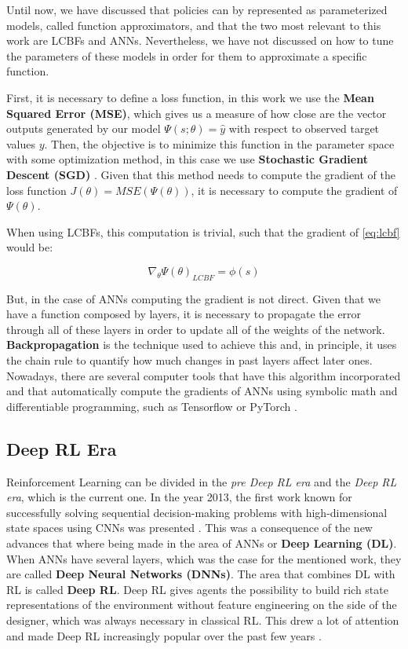 Until now, we have discussed that policies can by represented as parameterized models, called function approximators, and that the two most relevant to this work are LCBFs and ANNs. Nevertheless, we have not discussed on how to tune the parameters of these models in order for them to approximate a specific function.

First, it is necessary to define a loss function, in this work we use the \textbf{Mean Squared Error (MSE)}, which gives us a measure of how close are the vector outputs generated by our model $\Psi(s;\theta)=\hat{y}$ with respect to observed target values $y$. Then, the objective is to minimize this function in the parameter space with some optimization method, in this case we use \textbf{Stochastic Gradient Descent (SGD)} \cite{robbins1951stochastic, saad1998online}. Given that this method needs to compute the gradient of the loss function $J(\theta)=MSE(\Psi(\theta))$, it is necessary to compute the gradient of $\Psi(\theta)$.

When using LCBFs, this computation is trivial, such that the gradient of \ref{eq:lcbf} would be:

\begin{equation}
    \nabla_{\theta} \Psi(\theta)_{LCBF} = \phi(s)
\end{equation}

But, in the case of ANNs computing the gradient is not direct. Given that we have a function composed by layers, it is necessary to propagate the error through all of these layers in order to update all of the weights of the network. \textbf{Backpropagation} \cite{rumelhart1988learning} is the technique used to achieve this and, in principle, it uses the chain rule to quantify how much changes in past layers affect later ones. Nowadays, there are several computer tools that have this algorithm incorporated and that automatically compute the gradients of ANNs using symbolic math and differentiable programming, such as Tensorflow \cite{tensorflow2015-whitepaper} or PyTorch \cite{paszke2017automatic}.

\subsection{Deep RL Era}

Reinforcement Learning can be divided in the \emph{pre Deep RL era} and the \emph{Deep RL era}, which is the current one. In the year 2013, the first work known for successfully solving sequential decision-making problems with high-dimensional state spaces using CNNs was presented \cite{atari}. This was a consequence of the new advances that where being made in the area of ANNs or \textbf{Deep Learning (DL)}. When ANNs have several layers, which was the case for the mentioned work, they are called \textbf{Deep Neural Networks (DNNs)}. The area that combines DL with RL is called \textbf{Deep RL}. Deep RL gives agents the possibility to build rich state representations of the environment without feature engineering on the side of the designer, which was always necessary in classical RL. This drew a lot of attention and made Deep RL increasingly popular over the past few years \cite{franccois2018introduction}.

